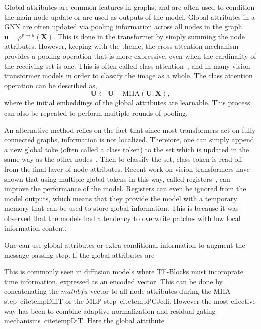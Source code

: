 Global attributes are common features in graphs, and are often used to condition the main node update or are used as outputs of the model.
Global attributes in a GNN are often updated via pooling information across all nodes in the graph $ \mathbf{u} = \rho^{v \to u}(\mathbf{X})$.
This is done in the transformer by simply summing the node attributes.
However, keeping with the theme, the cross-attention mechanism provides a pooling operation that is more expressive, even when the cardinality of the receiving set is one.
This is often called class attention~, and in many vision transformer models in order to classify the image as a whole.
The class attention operation can be described as,
\begin{equation}
    \mathbf{U} \leftarrow \mathbf{U} + \text{MHA}(\mathbf{U}, \mathbf{X}),
\end{equation}
where the initial embeddings of the global attributes are learnable.
This process can also be repeated to perform multiple rounds of pooling.

An alternative method relies on the fact that since most transformers act on fully connected graphs, information is not localized.
Therefore, one can simply append a new global toke (often called a class token) to the set which is updated in the same way as the other nodes~.
Then to classify the set, class token is read off from the final layer of node attributes.
Recent work on vision transformers have shown that using multiple global tokens in this way, called registers~, can improve the performance of the model.
Registers can even be ignored from the model outputs, which means that they provide the model with a temporary memory that can be used to store global information.
This is because it was observed that the models had a tendency to overwrite patches with low local information content.




One can use global attributes or extra conditional information to augment the message passing step.
If the global attributes are



This is commonly seen in diffusion models where TE-Blocks must incoroprate time information, expressed as an encoded vector.
This can be done by concatenating the $mathbf{u}$ vector to all node attributes during the MHA step~citetemp{DiffT} or the MLP step~citetemp{PCJedi}.
However the most effective way has been to combine adaptive normalization and residual gating mechanisms~citetemp{DiT}.
Here the global attribute




